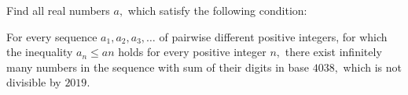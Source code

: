 Find all real numbers $a,$ which satisfy the following condition:

For every sequence  $a_1,a_2,a_3,\ldots$ of pairwise different positive integers, for which the inequality $a_n\leq an$ holds for every positive integer $n,$ there exist infinitely many numbers in the sequence with sum of their digits in base $4038,$ which is not divisible by $2019.$
